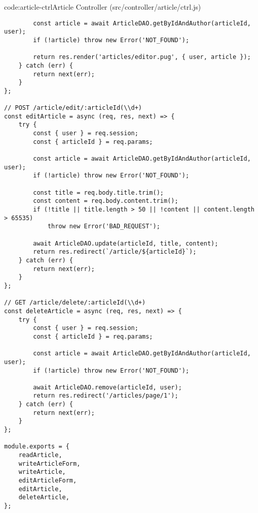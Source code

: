 \begin{codeenv}{code:article-ctrl}{Article Controller (src/controller/article/ctrl.js)}
\begin{verbatim}
        const article = await ArticleDAO.getByIdAndAuthor(articleId, user);
        if (!article) throw new Error('NOT_FOUND');

        return res.render('articles/editor.pug', { user, article });
    } catch (err) {
        return next(err);
    }
};

// POST /article/edit/:articleId(\\d+)
const editArticle = async (req, res, next) => {
    try {
        const { user } = req.session;
        const { articleId } = req.params;

        const article = await ArticleDAO.getByIdAndAuthor(articleId, user);
        if (!article) throw new Error('NOT_FOUND');

        const title = req.body.title.trim();
        const content = req.body.content.trim();
        if (!title || title.length > 50 || !content || content.length > 65535)
            throw new Error('BAD_REQUEST');

        await ArticleDAO.update(articleId, title, content);
        return res.redirect(`/article/${articleId}`);
    } catch (err) {
        return next(err);
    }
};

// GET /article/delete/:articleId(\\d+)
const deleteArticle = async (req, res, next) => {
    try {
        const { user } = req.session;
        const { articleId } = req.params;

        const article = await ArticleDAO.getByIdAndAuthor(articleId, user);
        if (!article) throw new Error('NOT_FOUND');

        await ArticleDAO.remove(articleId, user);
        return res.redirect('/articles/page/1');
    } catch (err) {
        return next(err);
    }
};

module.exports = {
    readArticle,
    writeArticleForm,
    writeArticle,
    editArticleForm,
    editArticle,
    deleteArticle,
};
\end{verbatim}
\end{codeenv}


